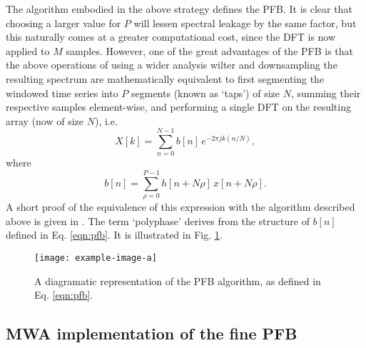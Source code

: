 \documentclass{pasa}%
\begin{document}
The algorithm embodied in the above strategy defines the PFB.
It is clear that choosing a larger value for $P$ will lessen spectral leakage by the same factor, but this naturally comes at a greater computational cost, since the DFT is now applied to $M$ samples.
However, one of the great advantages of the PFB is that the above operations of using a wider analysis wilter and downsampling the resulting spectrum are mathematically equivalent to first segmenting the windowed time series into $P$ segments (known as `taps') of size $N$, summing their respective samples element-wise, and performing a single DFT on the resulting array (now of size $N$), i.e.
\begin{equation}
    X[k] = \sum_{n=0}^{N-1} b[n]\,e^{-2\pi j k (n/N)},
    \label{eqn:pfb}
\end{equation}
where
\begin{equation*}
    b[n] = \sum_{\rho=0}^{P-1} h[n + N\rho]\,x[n + N\rho].
\end{equation*}
A short proof of the equivalence of this expression with the algorithm described above is given in \citet{Harris2011}.
The term `polyphase' derives from the structure of $b[n]$ defined in Eq. \eqref{eqn:pfb}.
It is illustrated in Fig. \ref{fig:pfb}.
\begin{figure}[t]
    \centering
    \texttt{[image: example-image-a]}
    \caption{A diagramatic representation of the PFB algorithm, as defined in Eq. \eqref{eqn:pfb}.}
    \label{fig:pfb}
\end{figure}


\subsection{MWA implementation of the fine PFB}
\end{document}
